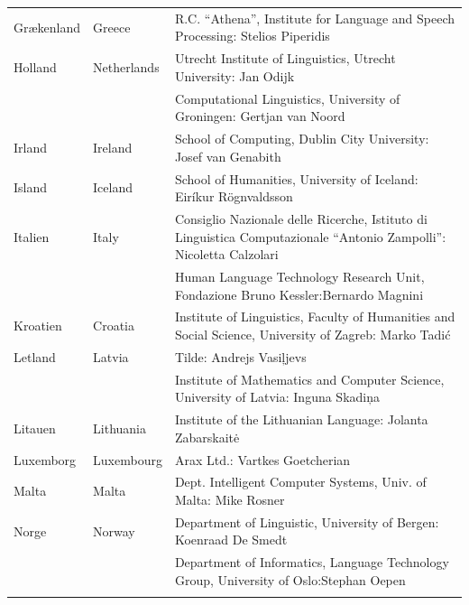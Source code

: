 \begin{longtable}{llp{105mm}}
  Gr\ae kenland & \textcolor{grey1}{Greece} & R.C. “Athena”, Institute for Language and Speech Processing: Stelios Piperidis\\ \addlinespace
  
 Holland & \textcolor{grey1}{Netherlands} & Utrecht Institute of Linguistics, Utrecht University: Jan Odijk\\ \addlinespace 
  & & Computational Linguistics, University of Groningen: Gertjan van Noord\\ \addlinespace
  
  Irland & \textcolor{grey1}{Ireland} & School of Computing, Dublin City University: Josef van Genabith\\ \addlinespace
  
  Island & \textcolor{grey1}{Iceland} & School of Humanities, University of Iceland: Eiríkur Rögnvaldsson\\ \addlinespace
  
  Italien & \textcolor{grey1}{Italy} & Consiglio Nazionale delle Ricerche, Istituto di Linguistica Computazionale “Antonio Zampolli”: Nicoletta Calzolari\\ \addlinespace
  & & Human Language Technology Research Unit, Fondazione Bruno Kessler:\newline Bernardo Magnini\\ \addlinespace
  
  Kroatien & \textcolor{grey1}{Croatia} & Institute of Linguistics, Faculty of Humanities and Social Science, University of Zagreb: Marko Tadić \\ \addlinespace
  
  Letland & \textcolor{grey1}{Latvia} & Tilde: Andrejs Vasiļjevs\\ \addlinespace 
  & & Institute of Mathematics and Computer Science, University of Latvia: Inguna Skadiņa\\ \addlinespace
  
  Litauen & \textcolor{grey1}{Lithuania} & Institute of the Lithuanian Language: Jolanta Zabarskaitė\\ \addlinespace
  
  Luxemborg & \textcolor{grey1}{Luxembourg} & Arax Ltd.: Vartkes Goetcherian\\ \addlinespace
  
  Malta & \textcolor{grey1}{Malta} & Dept. Intelligent Computer Systems, Univ. of Malta: Mike Rosner\\ \addlinespace
  
  Norge & \textcolor{grey1}{Norway} & Department of Linguistic, University of Bergen: Koenraad De Smedt\\ \addlinespace 
  & & Department of Informatics, Language Technology Group, University of Oslo:\newline Stephan Oepen \\ \addlinespace
  

\end{longtable}
